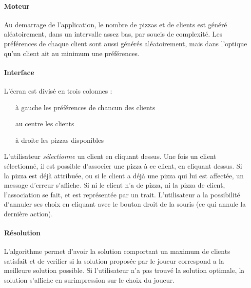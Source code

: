 		\paragraph{Moteur}
			Au demarrage de l'application, le nombre de pizzas et 
			 de clients est généré aléatoirement, dans un intervalle 
			 assez bas, par soucis de complexité.
			Les préférences de chaque client sont aussi générés aléatoirement,
			 mais dans l'optique qu'un client ait au minimum une préférences.
		\paragraph{Interface}
		    L'écran est divisé en trois colonnes :
		    \begin{itemize}
		        \item[à gauche] les préférences de chancun des clients
		        \item[au centre] les clients
		        \item[à droite] les pizzas disponibles
		    \end{itemize}

		L'utilisateur \emph{sélectionne} un client en cliquant dessus.
		    Une fois un client sélectionné, il est possible
		    d'associer une pizza à ce client, en cliquant dessus.
		    Si la pizza est déjà attribuée, ou si le client a déjà
		    une pizza qui lui est affectée, un message d'erreur s'affiche.
		    Si ni le client n'a de pizza, ni la pizza de client, l'association
		    se fait, et est représentée par un trait.
		L'utilisateur a la possibilité d'annuler ses choix en cliquant avec le bouton
		    droit de la souris (ce qui annule la dernière action).
		\paragraph{Résolution}
			L'algorithme permet d'avoir la solution comportant un maximum de clients
			 satisfait et de verifier si la solution proposée par le joueur correspond
			 a la meilleure solution possible.
 			Si l'utilisateur n'a pas trouvé la solution optimale, la solution s'affiche
			 en surimpression sur le choix du joueur.

